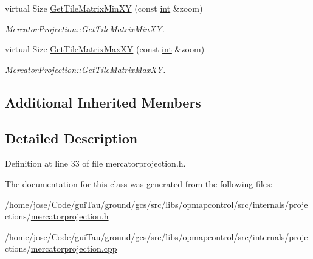 \begin{DoxyCompactItemize}
virtual Size \hyperlink{group___o_p_map_widget_ga9596b6c85652a05e732147c5e6e299ee}{Get\-Tile\-Matrix\-Min\-X\-Y} (const \hyperlink{ioapi_8h_a787fa3cf048117ba7123753c1e74fcd6}{int} \&zoom)
\begin{DoxyCompactList}\small\item\em \hyperlink{group___o_p_map_widget_ga9596b6c85652a05e732147c5e6e299ee}{Mercator\-Projection\-::\-Get\-Tile\-Matrix\-Min\-X\-Y}. \end{DoxyCompactList}\item 
virtual Size \hyperlink{group___o_p_map_widget_ga4c7d16ae190aea2fd84e2e046b14c39e}{Get\-Tile\-Matrix\-Max\-X\-Y} (const \hyperlink{ioapi_8h_a787fa3cf048117ba7123753c1e74fcd6}{int} \&zoom)
\begin{DoxyCompactList}\small\item\em \hyperlink{group___o_p_map_widget_ga4c7d16ae190aea2fd84e2e046b14c39e}{Mercator\-Projection\-::\-Get\-Tile\-Matrix\-Max\-X\-Y}. \end{DoxyCompactList}\end{DoxyCompactItemize}
\subsection*{Additional Inherited Members}


\subsection{Detailed Description}


Definition at line 33 of file mercatorprojection.\-h.



The documentation for this class was generated from the following files\-:\begin{DoxyCompactItemize}
\item 
/home/jose/\-Code/gui\-Tau/ground/gcs/src/libs/opmapcontrol/src/internals/projections/\hyperlink{mercatorprojection_8h}{mercatorprojection.\-h}\item 
/home/jose/\-Code/gui\-Tau/ground/gcs/src/libs/opmapcontrol/src/internals/projections/\hyperlink{mercatorprojection_8cpp}{mercatorprojection.\-cpp}\end{DoxyCompactItemize}
